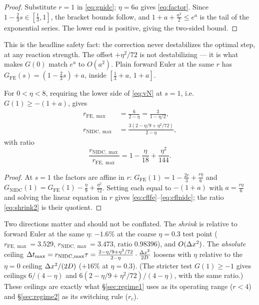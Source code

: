 \begin{proof}
Substitute $r=1$ in \eqref{eq:gnidc}; $\eta=6a$ gives \eqref{eq:factor}.
Since $1-\frac23 s\in[\frac13,1]$, the bracket bounds follow, and
$1+a+\frac{a^2}{2}\le e^a$ is the tail of the exponential series. The lower
end is positive, giving the two-sided bound.
\end{proof}

\noindent This is the headline safety fact: the correction never
destabilizes the optimal step, at any reaction strength. The offset
$+\eta^2/72$ is not destabilizing --- it is what makes $G(0)$ match $e^a$
to $O(a^2)$. Plain forward Euler at the same $r$ has
$G_{\mathrm{FE}}(s)=(1-\frac23 s)+a$, inside $[\frac13+a,\,1+a]$.

\begin{lemma}\label{lem:cfl}
For $0<\eta<8$, requiring the lower side of \eqref{eq:vN} at $s=1$, i.e.\
$G(1)\ge-(1+a)$, gives
\begin{align}
r_{\mathrm{FE},\max}&=\frac{6}{2-\eta}=\frac{3}{1-\eta/2},\label{eq:cflfe}\\
r_{\mathrm{NIDC},\max}&=\frac{3(2-\eta/9+\eta^2/72)}{2-\eta},\label{eq:cflnidc}
\end{align}
with ratio
\begin{equation}\label{eq:shrink2}
\frac{r_{\mathrm{NIDC},\max}}{r_{\mathrm{FE},\max}}
=1-\frac{\eta}{18}+\frac{\eta^2}{144}.
\end{equation}
\end{lemma}

\begin{proof}
At $s=1$ the factors are affine in $r$:
$G_{\mathrm{FE}}(1)=1-\frac{2r}{3}+\frac{r\eta}{6}$ and
$G_{\mathrm{NIDC}}(1)=G_{\mathrm{FE}}(1)-\frac{\eta}{9}+\frac{\eta^2}{72}$.
Setting each equal to $-(1+a)$ with $a=\frac{r\eta}{6}$ and solving the
linear equation in $r$ gives \eqref{eq:cflfe}--\eqref{eq:cflnidc}; the ratio
\eqref{eq:shrink2} is their quotient.
\end{proof}

\noindent Two directions matter and should not be conflated. The
\emph{shrink} is relative to forward Euler at the same $\eta$: $-1.6\%$ at
the coarse $\eta=0.3$ test point ($r_{\mathrm{FE},\max}=3.529$,
$r_{\mathrm{NIDC},\max}=3.473$, ratio $0.98396$), and $O(\Delta x^2)$. The \emph{absolute}
ceiling $\Delta t_{\max}=r_{\mathrm{NIDC},\max}\tau
=\frac{2-\eta/9+\eta^2/72}{2-\eta}\cdot\frac{\Delta x^2}{2D}$ loosens with
$\eta$ relative to the $\eta=0$ ceiling $\Delta x^2/(2D)$ ($+16\%$ at
$\eta=0.3$). (The stricter test $G(1)\ge-1$ gives ceilings $6/(4-\eta)$ and
$6(2-\eta/9+\eta^2/72)/(4-\eta)$, with the same ratio.) These ceilings are
exactly what \S\ref{sec:regime1} uses as its operating range ($r<4$) and
\S\ref{sec:regime2} as its switching rule ($r_c$).

